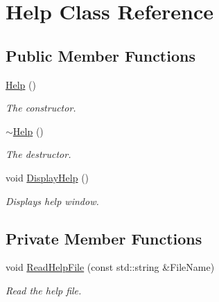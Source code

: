 \hypertarget{class_help}{\section{Help Class Reference}
\label{class_help}
}
\subsection*{Public Member Functions}
\begin{DoxyCompactItemize}
\item 
\hyperlink{class_help_aecdaeb53ac4c7dfef41c9bd8c341a928}{Help} ()
\begin{DoxyCompactList}\small\item\em The constructor. \end{DoxyCompactList}\item 
\hyperlink{class_help_a123b4195136758782058cb78cbd0baf7}{$\sim$\-Help} ()
\begin{DoxyCompactList}\small\item\em The destructor. \end{DoxyCompactList}\item 
void \hyperlink{class_help_a90df3a8e177928ed7d7043a51ee5ae7e}{Display\-Help} ()
\begin{DoxyCompactList}\small\item\em Displays help window. \end{DoxyCompactList}\end{DoxyCompactItemize}
\subsection*{Private Member Functions}
\begin{DoxyCompactItemize}
\item 
void \hyperlink{class_help_a343b57df159628b1e9707893b6c04655}{Read\-Help\-File} (const std\-::string \&File\-Name)
\begin{DoxyCompactList}\small\item\em Read the help file. \end{DoxyCompactList}\end{DoxyCompactItemize}
